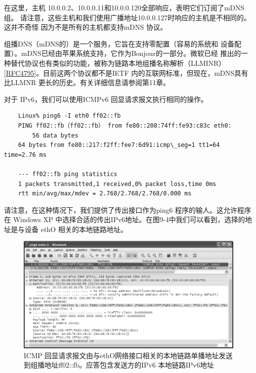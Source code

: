 在这里，主机 10.0.0.2、10.0.0.11和10.0.0.120全部响应，表明它们订阅了mDNS组。
请注意，这些主机和我们使用广播地址10.0.0.127时响应的主机是不相同的。这并不奇怪
因为不是所有的主机都支持mDNS 协议。

\begin{tcolorbox}
  组播DNS（mDNS的）是一个服务，它旨在支持零配置（容易的系统和
  设备配置）。mDNS已经由苹果系统支持，它作为Bonjour的一部分。微软已经
  推出的一种替代协议也有类似的功能，被称为链路本地组播名称解析（LLMINR）
  \href{https://www.rfc-editor.org/rfc/rfc4795}{[RFC4795]}。目前这两个协议都不是IETF
  内的互联网标准，但现在，mDNS具有
  比LLMNR 更长的历史。有关详细信息请参阅第11章。
\end{tcolorbox}

对于 IPv6，我们可以使用ICMPv6 回显请求报文执行相同的操作。

\begin{verbatim}
    Linux% ping6 -I eth0 ff02::fb
    PING ff02::fb（ff02::fb） from fe80::208:74ff:fe93:c83c eth0:
        56 data bytes
    64 bytes from fe80::217:f2ff:fee7:6d91:icmp\_seg=1 tt1=64 time=2.76 ms

    --- ff02::fb ping statistics
    1 packets transmitted,1 received,0% packet loss,time 0ms
    rtt min/avg/max/mdev = 2.768/2.768/2.768/0.000 ms
\end{verbatim}

请注意，在这种情况下，我们提供了传出接口作为ping6 程序的输人。这允许程序在
Windows XP 中选择合适的传出IPv6地址。在图9-4中我们可以看到，选择的地址是与设备
ethO 相关的本地链路地址。

\begin{figure}[ht]
  \centering
  \includegraphics[width=1\textwidth]{imgs/9/9-4.png}
  \caption{ICMP
  回显请求报文由与ethO网络接口相关的本地链路单播地址发送到组播地址ff02::fb。应答包含发送方的IPv6 本地链路IPv6地址}
\end{figure}

